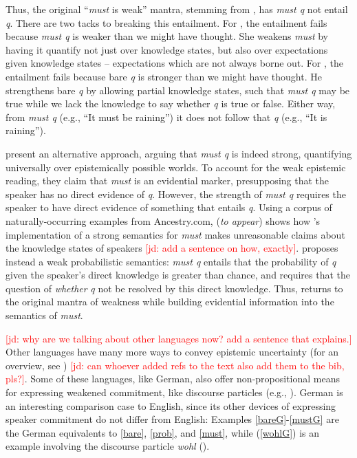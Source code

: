 \documentclass[11pt]{article}
\newcommand{\jd}[1]{\textcolor{Red}{[jd: #1]}}
\begin{document}
Thus, the original ``\emph{must} is weak'' mantra, stemming from \cite{karttunen1972}, has \emph{must q} not entail \emph{q}. There are two tacks to breaking this entailment. For \cite{kratzer1991}, the entailment fails because  \emph{must q} is weaker than we might have thought. She weakens \emph{must} by having it quantify not just over knowledge states, but also over expectations given knowledge states -- expectations which are not always borne out. For \cite{veltman1985}, the entailment fails because bare \emph{q} is stronger than we might have thought. He strengthens bare \emph{q} by allowing partial knowledge states, such that \emph{must q} may be true while we lack the knowledge to say whether \emph{q} is true or false. Either way, from \emph{must q} (e.g., ``It must be raining'') it does not follow that \emph{q} (e.g., ``It is raining'').

\cite{vonfintelgillies2010} present an alternative approach, arguing that \emph{must q} is indeed strong, quantifying universally over epistemically possible worlds. To account for the weak epistemic reading, they claim that \emph{must} is an evidential marker, presupposing that the speaker has no direct evidence of \emph{q}. However, the strength of \emph{must q} requires the speaker to have direct evidence of something that entails \emph{q}. Using a corpus of naturally-occurring examples from Ancestry.com, \citeauthor{lassiter2014salt} (\emph{to appear}) shows how \citeauthor{vonfintelgillies2010}'s implementation of a strong semantics for \emph{must} makes unreasonable claims about the knowledge states of speakers \jd{add a sentence on how, exactly}. \citeauthor{lassiter2014salt} proposes instead a weak probabilistic semantics: \emph{must q} entails that the probability of \emph{q} given the speaker's direct knowledge is greater than chance, and requires that the question of \emph{whether} \emph{q} not be resolved by this direct knowledge. Thus, \citeauthor{lassiter2014salt} returns to the original mantra of weakness while building evidential information into the semantics of \emph{must}.

\jd{why are we talking about other languages now? add a sentence that explains.} Other languages have many more ways to convey epistemic uncertainty (for an overview, see \cite{Drubig2001,Nuyts2001}) \jd{can whoever added refs to the text also add them to the bib, pls?}. Some of these languages, like German, also offer non-propositional means for expressing weakened commitment, like discourse particles (e.g., \cite{Zimmermann2011}). German is an interesting comparison case to English, since its other devices of expressing speaker commitment do not differ from English: Examples \ref{bareG}-\ref{mustG} are the German equivalents to \ref{bare}, \ref{prob}, and \ref{must}, while (\ref{wohlG}) is an example involving the discourse particle \emph{wohl} (\cite{Zimmermann 2004}).
\end{document}
